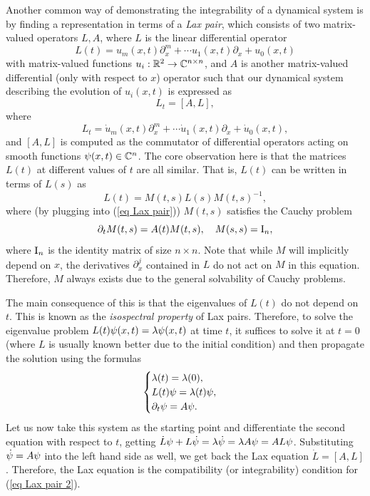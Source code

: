 \begin{example}\label{ex Lax pairs}
    Another common way of demonstrating the integrability of a dynamical system is by finding a representation in terms of a \emph{Lax pair}, which consists of two matrix-valued operators $L,A$, where $L$ is the linear differential operator
    \[L(t)=u_m(x,t)\partial_x^m+\cdots u_1(x,t)\partial_x+u_0(x,t)\]
    with matrix-valued functions $u_i:\bbR^2\to \bbC^{n\times n}$, and $A$ is another matrix-valued differential (only with respect to $x$) operator such that our dynamical system describing the evolution of $u_i(x,t)$ is expressed as 
    \[L_t=[A,L],\label{eq Lax pair}\]
    where 
    \[L_t=\dot u_m(x,t)\partial_x^m+\cdots \dot u_1(x,t)\partial_x+\dot u_0(x,t),\]
    and $[A,L]$ is computed as the commutator of differential operators acting on smooth functions $\bf{\psi}(x,t)\in\bbC^n$. The core observation here is that the matrices $L(t)$ at different values of $t$ are all similar. That is, $L(t)$ can be written in terms of $L(s)$ as 
    \[L(t)=M(t,s)L(s)M(t,s)^{-1},\]
    where (by plugging into (\ref{eq Lax pair})) $M(t,s)$ satisfies the Cauchy problem 
    \[\partial_t M(t,s)=A(t)M(t,s),\quad M(s,s)=\rmI_n,\]
    where $\rmI_n$ is the identity matrix of size $n\times n$.
    Note that while $M$ will implicitly depend on $x$, the derivatives $\partial_x^j$ contained in $L$ do not act on $M$ in this equation. Therefore, $M$ always exists due to the general solvability of Cauchy problems.

    The main consequence of this is that the eigenvalues of $L(t)$ do not depend on $t$. This is known as the \emph{isospectral property} of Lax pairs. Therefore, to solve the eigenvalue problem $L(t)\bf{\psi}(x,t)=\lambda\bf{\psi}(x,t)$ at time $t$, it suffices to solve it at $t=0$ (where $L$ is usually known better due to the initial condition) and then propagate the solution using the formulas
    \[\begin{cases}
        \lambda(t)=\lambda(0),\\
        L(t)\bf{\psi}=\lambda(t)\bf{\psi},\\
        \partial_t\bf{\psi}=A\bf{\psi}.
    \end{cases}\label{eq Lax pair 2}\]
    Let us now take this system as the starting point and differentiate the second equation with respect to $t$, getting $\dot L\bf{\psi}+L\dot{\bf{\psi}}=\lambda\dot{\bf{\psi}}=\lambda A\bf{\psi}=A L\bf{\psi}$. Substituting $\dot{\bf{\psi}}=A\bf{\psi}$ into the left hand side as well, we get back the Lax equation $\dot L=[A,L]$. Therefore, the Lax equation is the compatibility (or integrability) condition for (\ref{eq Lax pair 2}).


\end{example}
